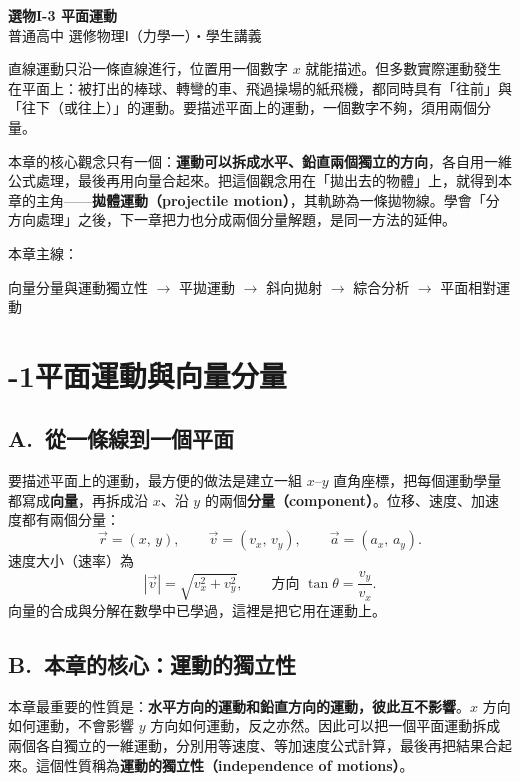 \documentclass[11pt]{article}
\begin{document}
\begin{center}
{\sffamily\Huge\bfseries 選物I-3 平面運動}\\[3pt]
{\sffamily\large 普通高中 選修物理Ⅰ（力學一）・學生講義}
\end{center}
\vspace{0.6em}

直線運動只沿一條直線進行，位置用一個數字 $x$ 就能描述。但多數實際運動發生在平面上：被打出的棒球、轉彎的車、飛過操場的紙飛機，都同時具有「往前」與「往下（或往上）」的運動。要描述平面上的運動，一個數字不夠，須用兩個分量。

本章的核心觀念只有一個：\textbf{運動可以拆成水平、鉛直兩個獨立的方向}，各自用一維公式處理，最後再用向量合起來。把這個觀念用在「拋出去的物體」上，就得到本章的主角——\textbf{拋體運動（projectile motion）}，其軌跡為一條拋物線。學會「分方向處理」之後，下一章把力也分成兩個分量解題，是同一方法的延伸。

\medskip
本章主線：

\begin{center}
向量分量與運動獨立性 $\rightarrow$ 平拋運動 $\rightarrow$ 斜向拋射 $\rightarrow$ 綜合分析 $\rightarrow$ 平面相對運動
\end{center}

\section*{-1\quad 平面運動與向量分量}

\subsection*{\sffamily A.\ 從一條線到一個平面}

要描述平面上的運動，最方便的做法是建立一組 $x$–$y$ 直角座標，把每個運動學量都寫成\textbf{向量}，再拆成沿 $x$、沿 $y$ 的兩個\textbf{分量（component）}。位移、速度、加速度都有兩個分量：
$$\vec r=(x,\,y),\qquad \vec v=(v_x,\,v_y),\qquad \vec a=(a_x,\,a_y).$$
速度大小（速率）為
$$|\vec v|=\sqrt{v_x^2+v_y^2},\qquad \text{方向 } \tan\theta=\frac{v_y}{v_x}.$$
向量的合成與分解在數學中已學過，這裡是把它用在運動上。

\subsection*{\sffamily B.\ 本章的核心：運動的獨立性}

本章最重要的性質是：\textbf{水平方向的運動和鉛直方向的運動，彼此互不影響}。$x$ 方向如何運動，不會影響 $y$ 方向如何運動，反之亦然。因此可以把一個平面運動拆成兩個各自獨立的一維運動，分別用等速度、等加速度公式計算，最後再把結果合起來。這個性質稱為\textbf{運動的獨立性（independence of motions）}。
\end{document}
